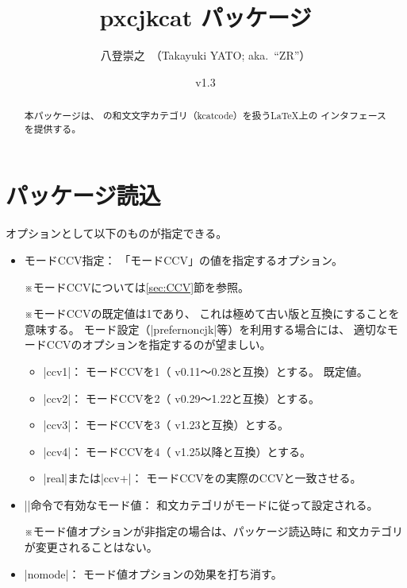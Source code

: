 \documentclass[uplatex,dvipdfmx,a4paper]{jsarticle}
\newenvironment{myverbatim}
  {\quote\small\verbatim}
  {\endverbatim\endquote}
\newcommand{\PkgVersion}{1.3}
\newcommand{\PkgDate}{2022/05/28}
\newcommand{\Pkg}[1]{\textsf{#1}}
\newcommand{\Note}{\par\noindent ※}
\newcommand{\Means}{：\quad}
\newcommand{\strong}{\textsf}
\begin{document}
\title{\Pkg{pxcjkcat} パッケージ}
\author{八登崇之\ （Takayuki YATO; aka.~``ZR''）}
\date{v\PkgVersion\quad[\PkgDate]}
\maketitle

\begin{abstract}
本パッケージは、
{\upTeX}の和文文字カテゴリ（kcatcode）を扱う{\LaTeX}上の
インタフェースを提供する。
\end{abstract}

\tableofcontents

\section{パッケージ読込}
\label{sec:Loading}

\begin{myverbatim}
\usepackage[<オプション>]{pxcjkcat}
\end{myverbatim}

オプションとして以下のものが指定できる。

\begin{itemize}
\item \strong{モードCCV指定}\Means
  \<「モードCCV」の値を指定するオプション。
  \Note モードCCVについては\ref{sec:CCV}節を参照。
  \Note モードCCVの既定値は1であり、
  これは極めて古い版と互換にすることを意味する。
  モード設定（|prefernoncjk|等）を利用する場合には、
  適切なモードCCVのオプションを指定するのが望ましい。
  \begin{itemize}
  \item |ccv1|\Means
    モードCCVを1（{\upTeX} v0.11～0.28と互換）とする。
    \strong{既定値。}
  \item |ccv2|\Means
    モードCCVを2（{\upTeX} v0.29～1.22と互換）とする。
  \item |ccv3|\Means
    モードCCVを3（{\upTeX} v1.23と互換）とする。
  \item |ccv4|\Means
    モードCCVを4（{\upTeX} v1.25以降と互換）とする。
  \item |real|または|ccv+|\Means
    モードCCVを{\upTeX}の実際のCCVと一致させる。
  \end{itemize}
\item |\cjkcategorymode|\strong{命令で有効なモード値}\Means
  和文カテゴリがモードに従って設定される。
  \Note モード値オプションが非指定の場合は、パッケージ読込時に
  和文カテゴリが変更されることはない。
\item |nomode|\Means
  モード値オプションの効果を打ち消す。
\end{itemize}
\end{document}
